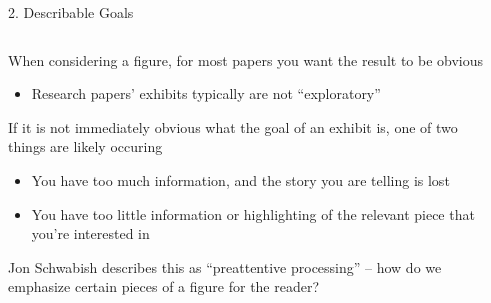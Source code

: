 \documentclass[notes,11pt, aspectratio=169]{beamer}
\newcommand\1{\operatorname{\mathbbm{1}}\indicatorfence}
\newenvironment{wideitemize}{\itemize\addtolength{\itemsep}{10pt}}{\enditemize}
\begin{document}
\begin{frame}{2. Describable Goals}
  \begin{columns}[T] %
    \begin{column}{.6\textwidth}
      \begin{wideitemize}
      \item When considering a figure, for most papers you want the
        result to be obvious
        \begin{itemize}
        \item Research papers' exhibits typically are not
          ``exploratory''
        \end{itemize}
      \item If it is not immediately obvious what the goal of an
        exhibit is, one of two things are likely occuring
        \begin{itemize}
        \item You have too much information, and the story you are telling is lost
        \item You have too little information or highlighting of the
          relevant piece that you're interested in
        \end{itemize}
      \item Jon Schwabish describes this as ``preattentive
        processing'' -- how do we emphasize certain pieces of a figure
        for the reader?
      \end{wideitemize}
  \end{column}%
  \hfill%
  \begin{column}{.4\textwidth}
  \end{column}
\end{columns}
\end{frame}
\end{document}
